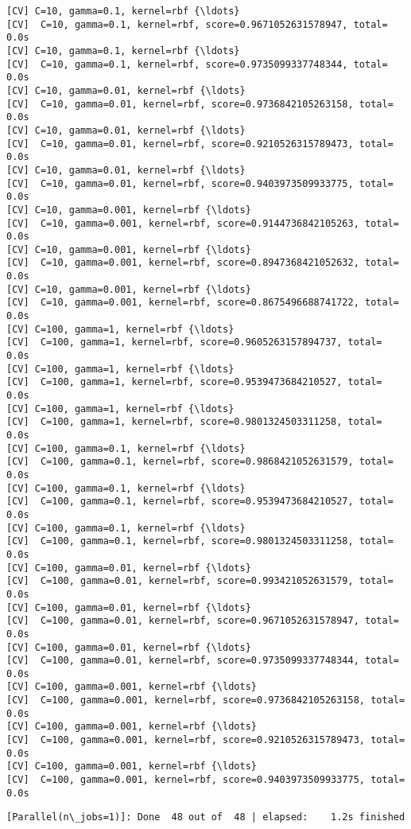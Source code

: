 \documentclass[11pt]{article}
\begin{document}
\begin{Verbatim}[commandchars=\\\{\}]
[CV] C=10, gamma=0.1, kernel=rbf {\ldots}
[CV]  C=10, gamma=0.1, kernel=rbf, score=0.9671052631578947, total=   0.0s
[CV] C=10, gamma=0.1, kernel=rbf {\ldots}
[CV]  C=10, gamma=0.1, kernel=rbf, score=0.9735099337748344, total=   0.0s
[CV] C=10, gamma=0.01, kernel=rbf {\ldots}
[CV]  C=10, gamma=0.01, kernel=rbf, score=0.9736842105263158, total=   0.0s
[CV] C=10, gamma=0.01, kernel=rbf {\ldots}
[CV]  C=10, gamma=0.01, kernel=rbf, score=0.9210526315789473, total=   0.0s
[CV] C=10, gamma=0.01, kernel=rbf {\ldots}
[CV]  C=10, gamma=0.01, kernel=rbf, score=0.9403973509933775, total=   0.0s
[CV] C=10, gamma=0.001, kernel=rbf {\ldots}
[CV]  C=10, gamma=0.001, kernel=rbf, score=0.9144736842105263, total=   0.0s
[CV] C=10, gamma=0.001, kernel=rbf {\ldots}
[CV]  C=10, gamma=0.001, kernel=rbf, score=0.8947368421052632, total=   0.0s
[CV] C=10, gamma=0.001, kernel=rbf {\ldots}
[CV]  C=10, gamma=0.001, kernel=rbf, score=0.8675496688741722, total=   0.0s
[CV] C=100, gamma=1, kernel=rbf {\ldots}
[CV]  C=100, gamma=1, kernel=rbf, score=0.9605263157894737, total=   0.0s
[CV] C=100, gamma=1, kernel=rbf {\ldots}
[CV]  C=100, gamma=1, kernel=rbf, score=0.9539473684210527, total=   0.0s
[CV] C=100, gamma=1, kernel=rbf {\ldots}
[CV]  C=100, gamma=1, kernel=rbf, score=0.9801324503311258, total=   0.0s
[CV] C=100, gamma=0.1, kernel=rbf {\ldots}
[CV]  C=100, gamma=0.1, kernel=rbf, score=0.9868421052631579, total=   0.0s
[CV] C=100, gamma=0.1, kernel=rbf {\ldots}
[CV]  C=100, gamma=0.1, kernel=rbf, score=0.9539473684210527, total=   0.0s
[CV] C=100, gamma=0.1, kernel=rbf {\ldots}
[CV]  C=100, gamma=0.1, kernel=rbf, score=0.9801324503311258, total=   0.0s
[CV] C=100, gamma=0.01, kernel=rbf {\ldots}
[CV]  C=100, gamma=0.01, kernel=rbf, score=0.993421052631579, total=   0.0s
[CV] C=100, gamma=0.01, kernel=rbf {\ldots}
[CV]  C=100, gamma=0.01, kernel=rbf, score=0.9671052631578947, total=   0.0s
[CV] C=100, gamma=0.01, kernel=rbf {\ldots}
[CV]  C=100, gamma=0.01, kernel=rbf, score=0.9735099337748344, total=   0.0s
[CV] C=100, gamma=0.001, kernel=rbf {\ldots}
[CV]  C=100, gamma=0.001, kernel=rbf, score=0.9736842105263158, total=   0.0s
[CV] C=100, gamma=0.001, kernel=rbf {\ldots}
[CV]  C=100, gamma=0.001, kernel=rbf, score=0.9210526315789473, total=   0.0s
[CV] C=100, gamma=0.001, kernel=rbf {\ldots}
[CV]  C=100, gamma=0.001, kernel=rbf, score=0.9403973509933775, total=   0.0s

    \end{Verbatim}

    \begin{Verbatim}[commandchars=\\\{\}]
[Parallel(n\_jobs=1)]: Done  48 out of  48 | elapsed:    1.2s finished

    \end{Verbatim}
\end{document}

